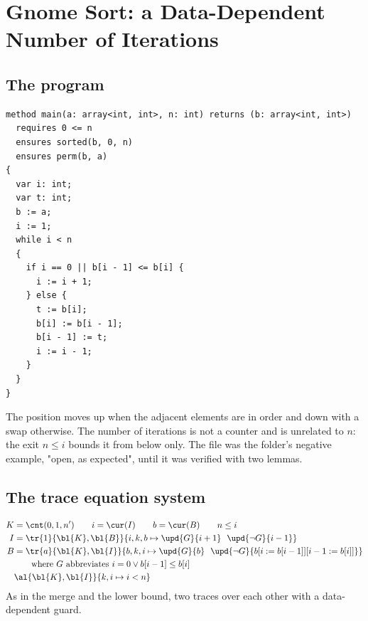 \section{Gnome Sort: a Data-Dependent Number of Iterations}\label{sec:gnome}

\subsection{The program}
\begin{lstlisting}
method main(a: array<int, int>, n: int) returns (b: array<int, int>)
  requires 0 <= n
  ensures sorted(b, 0, n)
  ensures perm(b, a)
{
  var i: int;
  var t: int;
  b := a;
  i := 1;
  while i < n
  {
    if i == 0 || b[i - 1] <= b[i] {
      i := i + 1;
    } else {
      t := b[i];
      b[i] := b[i - 1];
      b[i - 1] := t;
      i := i - 1;
    }
  }
}
\end{lstlisting}
The position moves up when the adjacent elements are in order and down with a swap otherwise. The number of
iterations is not a counter and is unrelated to $n$: the exit $n \le i$ bounds it from below only. The file
was the folder's negative example, "open, as expected", until it was verified with two lemmas.

\subsection{The trace equation system}
\begin{align}
  K &= \cnt(0, 1, n') \qquad i = \cur(I) \qquad b = \cur(B) \qquad n \le i \label{eq:gn0}\\
  I &= \tr{1}{\bl{K}, \bl{B}}{i, k, b \mapsto \upd{G}{i + 1}\ \ \upd{\neg G}{i - 1}} \label{eq:gn1}\\
  B &= \tr{a}{\bl{K}, \bl{I}}{b, k, i \mapsto \upd{G}{b}\ \ \upd{\neg G}{b[i := b[i - 1]][i - 1 := b[i]]}} \label{eq:gn2}\\
  &\qquad\text{where } G \text{ abbreviates } i = 0 \vee b[i - 1] \le b[i] \nonumber\\
  &\al{\bl{K}, \bl{I}}{k, i \mapsto i < n} \label{eq:gn3}
\end{align}
As in the merge and the lower bound, two traces over each other with a data-dependent guard.

